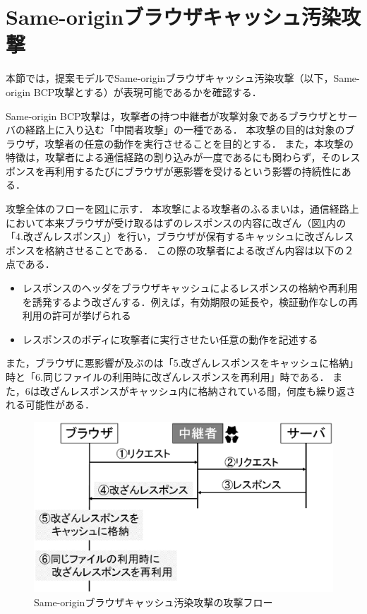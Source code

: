 \documentclass[12pt,a4paper]{jbook}
\begin{document}
\section{Same-originブラウザキャッシュ汚染攻撃}
\label{sec:same-origin-bcp}
本節では，提案モデルでSame-originブラウザキャッシュ汚染攻撃\cite{bcpattack}（以下，Same-origin BCP攻撃とする）が表現可能であるかを確認する．

Same-origin BCP攻撃は，攻撃者の持つ中継者が攻撃対象であるブラウザとサーバの経路上に入り込む「中間者攻撃」の一種である．
本攻撃の目的は対象のブラウザ，攻撃者の任意の動作を実行させることを目的とする．
また，本攻撃の特徴は，攻撃者による通信経路の割り込みが一度であるにも関わらず，そのレスポンスを再利用するたびにブラウザが悪影響を受けるという影響の持続性にある．

攻撃全体のフローを図\ref{fig:SameBCP_flow}に示す．
本攻撃による攻撃者のふるまいは，通信経路上において本来ブラウザが受け取るはずのレスポンスの内容に改ざん（図\ref{fig:SameBCP_flow}内の「4.改ざんレスポンス」）を行い，ブラウザが保有するキャッシュに改ざんレスポンスを格納させることである．
この際の攻撃者による改ざん内容は以下の２点である．
\begin{itemize}
\item レスポンスのヘッダをブラウザキャッシュによるレスポンスの格納や再利用を誘発するよう改ざんする．例えば，有効期限の延長や，検証動作なしの再利用の許可が挙げられる
\item レスポンスのボディに攻撃者に実行させたい任意の動作を記述する
\end{itemize}
また，ブラウザに悪影響が及ぶのは「5.改ざんレスポンスをキャッシュに格納」時と「6.同じファイルの利用時に改ざんレスポンスを再利用」時である．
また，6は改ざんレスポンスがキャッシュ内に格納されている間，何度も繰り返される可能性がある．

\begin{figure}[htb]
\centering
\includegraphics[width=400pt]{./fig/SameBCP_flow.eps}
\caption{Same-originブラウザキャッシュ汚染攻撃の攻撃フロー}
\label{fig:SameBCP_flow}
\end{figure}
\end{document}

